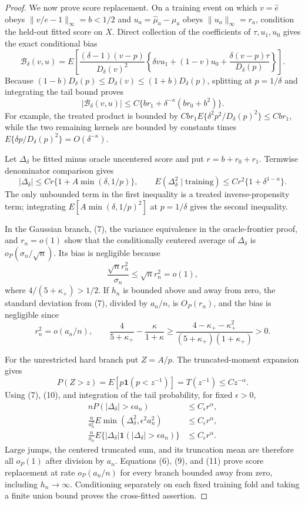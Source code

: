 \documentclass{article}
\begin{document}
\begin{proof}
We now prove score replacement.  On a training event on which \(v=\widehat e\) obeys \(\|v/e-1\|_\infty=b<1/2\) and \(u_a=\widehat\mu_a-\mu_a\) obeys \(\|u_a\|_\infty=r_a\), condition the held-out fitted score on \(X\).  Direct collection of the coefficients of \(\tau,u_1,u_0\) gives the exact conditional bias
\[
 \mathcal B_\delta(v,u)
 =E\!\left[
 \frac{(\delta-1)(v-p)}{D_\delta(v)^2}
 \left\{\delta vu_1+(1-v)u_0+\frac{\delta(v-p)\tau}{D_\delta(p)}\right\}
 \right]. \tag{5}
\]
Because \((1-b)D_\delta(p)\leq D_\delta(v)\leq(1+b)D_\delta(p)\), splitting at \(p=1/\delta\) and integrating the tail bound proves
\[
 |\mathcal B_\delta(v,u)|
 \leq C\{br_1+\delta^{-\kappa}(br_0+b^2)\}. \tag{6}
\]
For example, the treated product is bounded by \(Cbr_1E\{\delta^2p^2/D_\delta(p)^2\}\leq Cbr_1\), while the two remaining kernels are bounded by constants times \(E\{\delta p/D_\delta(p)^2\}=O(\delta^{-\kappa})\).

Let \(\Delta_\delta\) be fitted minus oracle uncentered score and put \(r=b+r_0+r_1\).  Termwise denominator comparison gives
\[
 |\Delta_\delta|\leq Cr\{1+A\min(\delta,1/p)\},\qquad
 E(\Delta_\delta^2\mid\text{training})\leq Cr^2\{1+\delta^{1-\kappa}\}. \tag{7}
\]
The only unbounded term in the first inequality is a treated inverse-propensity term; integrating
\(E[A\min(\delta,1/p)^2]\) at \(p=1/\delta\) gives the second inequality.

In the Gaussian branch, (7), the variance equivalence in the oracle-frontier proof, and \(r_n=o(1)\) show that the conditionally centered average of \(\Delta_\delta\) is \(o_P(\sigma_n/\sqrt n)\).  Its bias is negligible because
\[
 \frac{\sqrt n r_n^2}{\sigma_n}\leq\sqrt n r_n^2=o(1), \tag{8}
\]
where \(4/(5+\kappa_+)>1/2\).  If \(h_n\) is bounded above and away from zero, the standard deviation from (7), divided by \(a_n/n\), is \(O_P(r_n)\), and the bias is negligible since
\[
 r_n^2=o(a_n/n),\qquad
 \frac4{5+\kappa_+}-\frac{\kappa}{1+\kappa}
 \geq\frac{4-\kappa_+-\kappa_+^2}{(5+\kappa_+)(1+\kappa_+)}>0. \tag{9}
\]

For the unrestricted hard branch put \(Z=A/p\).  The truncated-moment expansion gives
\[
 P(Z>z)=E[p\mathbf1(p<z^{-1})]=T(z^{-1})\leq Cz^{-\alpha}. \tag{10}
\]
Using (7), (10), and integration of the tail probability, for fixed \(\epsilon>0\),
\[
\begin{split}
 nP(|\Delta_\delta|>\epsilon a_n)&\leq C_\epsilon r^\alpha,\\
 \frac n{a_n^2}E\min(\Delta_\delta^2,\epsilon^2a_n^2)&\leq C_\epsilon r^\alpha,\\
 \frac n{a_n}E\{|\Delta_\delta|\mathbf1(|\Delta_\delta|>\epsilon a_n)\}&\leq C_\epsilon r^\alpha.
\end{split} \tag{11}
\]
Large jumps, the centered truncated sum, and its truncation mean are therefore all \(o_P(1)\) after division by \(a_n\).  Equations (6), (9), and (11) prove score replacement at rate \(o_P(a_n/n)\) for every branch bounded away from zero, including \(h_n\to\infty\).  Conditioning separately on each fixed training fold and taking a finite union bound proves the cross-fitted assertion.


\end{proof}
\end{document}
